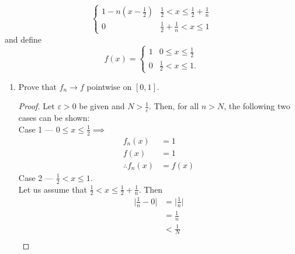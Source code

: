 \documentclass{article}
\begin{document}
\begin{enumerate}
\begin{equation}
\begin{cases}
                        1-n(x-\frac{1}{2})
                         & \frac{1}{2} < x \leq \frac{1}{2}+\frac{1}{n} \\

                        0
                         & \frac{1}{2}+\frac{1}{n} < x \leq 1
                  \end{cases}
            \end{equation}
            and define
            \begin{equation}
                  f(x)=\begin{cases}
                        1 & 0 \leq x \leq \frac{1}{2} \\
                        0 & \frac{1}{2} < x \leq 1.
                  \end{cases}
            \end{equation}
            \begin{enumerate}
                  \item Prove that $f_n\to f$ pointwise on $[0,1]$.
                        \begin{proof}
                              Let $\varepsilon>0$ be given and $N>\frac{1}{\varepsilon}$. Then, for
                              all $n>N$, the following two cases can be
                              shown: \\
                              Case 1 — $0\leq x \leq \frac{1}{2}\implies$
                              \begin{align*}
                                    f_n(x)             & = 1    \\
                                    f(x)               & = 1    \\
                                    \therefore  f_n(x) & = f(x)
                              \end{align*}
                              Case 2 — $\frac{1}{2}< x \leq 1.$ \\
                              Let us assume that $\frac{1}{2}< x \leq\frac{1}{2} + \frac{1}{n}$.
                              Then
                              \begin{align*}
                                    \lvert\frac{1}{n}-0\rvert & = \lvert\frac{1}{n}\rvert \\
                                                              & = \frac{1}{n}             \\
                                                              & < \frac{1}{N}             \\

\end{align*}
\end{proof}
\end{enumerate}
\end{enumerate}
\end{document}

